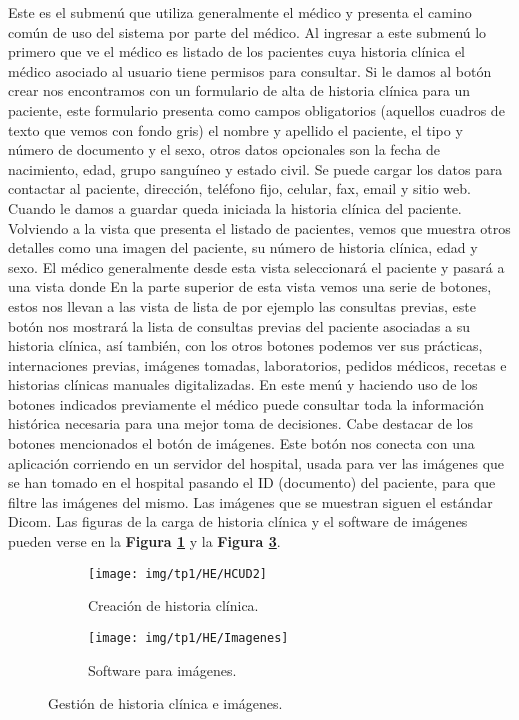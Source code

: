 Este es el submenú que utiliza generalmente el médico y presenta el camino común de uso del sistema por parte del médico. Al ingresar a este submenú lo primero que ve el médico es listado de los pacientes cuya historia clínica el médico asociado al usuario tiene permisos para consultar.
Si le damos al botón crear nos encontramos con un formulario de alta de historia clínica para un paciente, este formulario presenta como campos obligatorios (aquellos cuadros de texto que vemos con fondo gris) el nombre y apellido el paciente, el tipo y número de documento y el sexo, otros datos opcionales son la fecha de nacimiento, edad, grupo sanguíneo y estado civil. Se puede cargar los datos para contactar al paciente, dirección, teléfono fijo, celular, fax, email y sitio web. Cuando le damos a guardar queda iniciada la historia clínica del paciente.
Volviendo a la vista que presenta el listado de pacientes, vemos que muestra otros detalles como una imagen del paciente, su número de historia clínica, edad y sexo. El médico generalmente desde esta vista seleccionará el paciente y pasará a una vista donde
En la parte superior de esta vista vemos una serie de botones, estos nos llevan a las vista de lista de por ejemplo las consultas previas, este botón nos mostrará la lista de consultas previas del paciente asociadas a su historia clínica, así también, con los otros botones podemos ver sus prácticas, internaciones previas, imágenes tomadas, laboratorios, pedidos médicos, recetas e historias clínicas manuales digitalizadas. En este menú y haciendo uso de los botones indicados previamente el médico puede consultar toda la información histórica necesaria para una mejor toma de decisiones. 
Cabe destacar de los botones mencionados el botón de imágenes.
Este botón nos conecta con una aplicación corriendo en un servidor del hospital, usada para ver las imágenes que se han tomado en el hospital pasando el ID (documento) del paciente, para que filtre las imágenes del mismo. Las imágenes que se muestran siguen el estándar Dicom. Las figuras de la carga de historia clínica y el software de imágenes pueden verse en la \textbf{Figura \ref{hc-nueva}} y la \textbf{Figura \ref{sw-imagen}}.

\begin{figure}[h]
      \centering
      \begin{subfigure}[t]{1\textwidth}
        \texttt{[image: img/tp1/HE/HCUD2]}
        \caption{Creación de historia clínica.}
        \label{hc-nueva}
      \end{subfigure}
      \hfill%
      \begin{subfigure}[t]{1\textwidth}
        \texttt{[image: img/tp1/HE/Imagenes]}
        \caption{Software para imágenes.}
        \label{sw-imagen}
	  \end{subfigure}
	  \caption{Gestión de historia clínica e imágenes.}
\end{figure}
\clearpage

